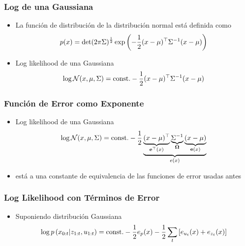 \begin{frame}
    \frametitle{Log de una Gaussiana}

    
    \begin{itemize}
        \item La función de distribución de la distribución normal está definida como
        \begin{equation*}
            p(x)=\det(2\pi\Sigma)^{\frac{1}{2}} \exp\left(-\dfrac{1}{2} (x - \mu )^{\top} {\Sigma}^{-1} (x - \mu )  \right)
        \end{equation*}
        
        \item Log likelihood de una Gaussiana
        \begin{equation*}
            \log \mathcal{N}(x, \mu, \Sigma) =  \text{const.} - \dfrac{1}{2} (x - \mu)^{\top} {\Sigma}^{-1} (x - \mu)
        \end{equation*}
    \end{itemize}
    
\end{frame}

\begin{frame}
    \frametitle{Función de Error como Exponente}
    
    \begin{itemize}
        \item Log likelihood de una Gaussiana
        \begin{equation*}
            \log \mathcal{N}(x, \mu, \Sigma) =  \text{const.} - \dfrac{1}{2} \underbrace{\underbrace{(x - \mu)^{\top}}_{\boldsymbol{\mathbf{e}}^{\top}(x)} \underbrace{{\Sigma}^{-1}}_{\boldsymbol{\mathbf{\Omega}}} \underbrace{(x - \mu)}_{\boldsymbol{\mathbf{e}}(x)}}_{e(x)}
        \end{equation*}
        \item está a una constante de equivalencia de las funciones de error usadas antes
    \end{itemize}
    
\end{frame}

\begin{frame}
    \frametitle{Log Likelihood con Términos de Error}
    
    \begin{itemize}
        \item Suponiendo distribución Gaussiana
        \begin{equation*}
            \log p\left( x_{0:t} | z_{1:t}, u_{1:t} \right) = \text{const.} - \dfrac{1}{2} e_{p}(x) -  \dfrac{1}{2} \sum_{t} \left[ e_{u_{t}}(x) + e_{z_{t}}(x)\right]
        \end{equation*}
    \end{itemize}
    
\end{frame}

